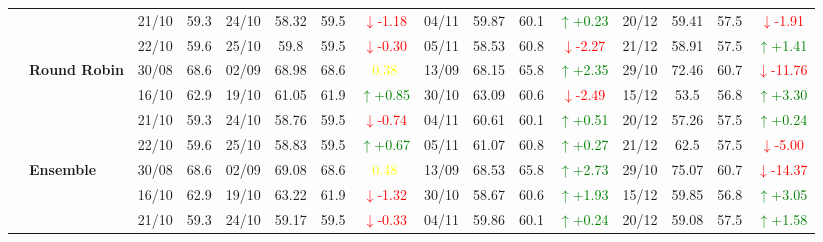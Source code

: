 \documentclass{ieeeaccess}
\begin{document}
{\begin{longtable}{llcc|cccc|cccc|cccc}
&
& 21/10 & 59.3 & 24/10 & 58.32 & 59.5 & \textcolor{red}{\(\downarrow\)-1.18} & 04/11 & 59.87 & 60.1 & \textcolor{green}{\(\uparrow\)+0.23} & 20/12 & 59.41 & 57.5 & \textcolor{red}{\(\downarrow\)-1.91} \\

&
& 22/10 & 59.6 & 25/10 & 59.8 & 59.5 & \textcolor{red}{\(\downarrow\)-0.30} & 05/11 & 58.53 & 60.8 & \textcolor{red}{\(\downarrow\)-2.27} & 21/12 & 58.91 & 57.5 & \textcolor{green}{\(\uparrow\)+1.41} \\
\cmidrule(lr){2-16}


& \textbf{Round Robin}
& 30/08 & 68.6 & 02/09 & 68.98 & 68.6 & \textcolor{yellow}{0.38} & 13/09 & 68.15 & 65.8 & \textcolor{green}{\(\uparrow\)+2.35} & 29/10 & 72.46 & 60.7 & \textcolor{red}{\(\downarrow\)-11.76} \\

&
& 16/10 & 62.9 & 19/10 & 61.05 & 61.9 & \textcolor{green}{\(\uparrow\)+0.85} & 30/10 & 63.09 & 60.6 & \textcolor{red}{\(\downarrow\)-2.49} & 15/12 & 53.5 & 56.8 & \textcolor{green}{\(\uparrow\)+3.30} \\

&
& 21/10 & 59.3 & 24/10 & 58.76 & 59.5 & \textcolor{red}{\(\downarrow\)-0.74} & 04/11 & 60.61 & 60.1 & \textcolor{green}{\(\uparrow\)+0.51} & 20/12 & 57.26 & 57.5 & \textcolor{green}{\(\uparrow\)+0.24} \\

&
& 22/10 & 59.6 & 25/10 & 58.83 & 59.5 & \textcolor{green}{\(\uparrow\)+0.67} & 05/11 & 61.07 & 60.8 & \textcolor{green}{\(\uparrow\)+0.27} & 21/12 & 62.5 & 57.5 & \textcolor{red}{\(\downarrow\)-5.00} \\
\cmidrule(lr){2-16}

& \textbf{Ensemble}
& 30/08 & 68.6 & 02/09 & 69.08 & 68.6 & \textcolor{yellow}{0.48} & 13/09 & 68.53 & 65.8 & \textcolor{green}{\(\uparrow\)+2.73} & 29/10 & 75.07 & 60.7 & \textcolor{red}{\(\downarrow\)-14.37} \\

&
& 16/10 & 62.9 & 19/10 & 63.22 & 61.9 & \textcolor{red}{\(\downarrow\)-1.32} & 30/10 & 58.67 & 60.6 & \textcolor{green}{\(\uparrow\)+1.93} & 15/12 & 59.85 & 56.8 & \textcolor{green}{\(\uparrow\)+3.05} \\

&
& 21/10 & 59.3 & 24/10 & 59.17 & 59.5 & \textcolor{red}{\(\downarrow\)-0.33} & 04/11 & 59.86 & 60.1 & \textcolor{green}{\(\uparrow\)+0.24} & 20/12 & 59.08 & 57.5 & \textcolor{green}{\(\uparrow\)+1.58} \\


\end{longtable}}
\end{document}
